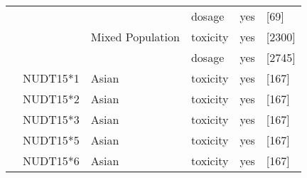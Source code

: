 \begin{center}
\begin{longtable}[H]{|l|l|l|l||l||l|}
\cline{4-6}
& & & dosage & yes & \citeauthor{Shah_2017} \citeyear{Shah_2017} [69] \\
\cline{3-6}
& & Mixed Population & toxicity & yes & \citeauthor{Yin_2017} \citeyear{Yin_2017} [2300] \\
\cline{4-6}
& & & dosage & yes & \citeauthor{Yin_2017} \citeyear{Yin_2017} [2745] \\
\cline{2-6}
& NUDT15*1 & Asian & toxicity & yes & \citeauthor{Lee_2016} \citeyear{Lee_2016} [167] \\
\cline{2-6}
& NUDT15*2 & Asian & toxicity & yes & \citeauthor{Lee_2016} \citeyear{Lee_2016} [167] \\
\cline{2-6}
& NUDT15*3 & Asian & toxicity & yes & \citeauthor{Lee_2016} \citeyear{Lee_2016} [167] \\
\cline{2-6}
& NUDT15*5 & Asian & toxicity & yes & \citeauthor{Lee_2016} \citeyear{Lee_2016} [167] \\
\cline{2-6}
& NUDT15*6 & Asian & toxicity & yes & \citeauthor{Lee_2016} \citeyear{Lee_2016} [167] \\
\hline\hline
\end{longtable}
\end{center}
